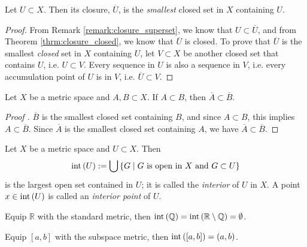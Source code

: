 \begin{theorem}
	Let $U\subset X$. Then its closure, $\overline{U}$, is the \textit{smallest} closed set in $X$ containing $U$.
\end{theorem}

\begin{proof}
	From Remark \ref{remark:closure_superset}, we know that $U\subset \overline{U}$, and from Theorem \ref{thrm:closure_closed}, we know that $\overline{U}$ is closed. To prove that $\overline{U}$ is the smallest \textit{closed} set in $X$ containing $U$, let $V\subset X$ be another closed set that contains $U$, i.e. $U\subset V$. Every sequence in $U$ is also a sequence in $V$, i.e. every accumulation point of $U$ is in $V$, i.e. $\overline{U}\subset V$.
\end{proof}

\begin{corollary}\label{corollary:closure_subset_property}
	Let $X$ be a metric space and $A, B\subset X$. If $A\subset B$, then $\overline{A}\subset \overline{B}$.
\end{corollary}

\begin{proof}[Proof \cite{121238}]
	$\overline{B}$ is the smallest closed set containing $B$, and since $A\subset B$, this implies $A\subset \overline{B}$. Since $\overline{A}$ is the smallest closed set containing $A$, we have $\overline{A}\subset\overline{B}$.
\end{proof}

\begin{defn}\label{defn:interior}
	Let $X$ be a metric space and $U\subset X$. Then 
	\begin{align}
		\text{int}\left( U \right) := \bigcup \left\{ G\mid G \text{ is open in } X \text{ and } G \subset U \right\}
	\end{align}
	is the largest open set contained in $U$; it is called the \textit{interior} of $U$ in $X$. A point $x\in \text{int}\left( U \right)$ is called an \textit{interior point} of $U$.
\end{defn}

\begin{exmp}
	Equip $\mathbb R$ with the standard metric, then $\text{int}\left( \mathbb Q \right) = \text{int}\left( \mathbb R \setminus \mathbb Q \right) = \emptyset$.
\end{exmp}

\begin{exmp}
	Equip $[a, b]$ with the subspace metric, then $\text{int}\left( [a, b] \right) = (a, b)$.
\end{exmp}

